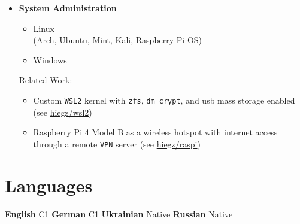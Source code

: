 \documentclass[]{article}
\begin{document}
\begin{minipage}[t]{0.49\linewidth}
    \begin{itemize}[leftmargin=0.15in, rightmargin=0.15in, label={}]
        \item {\large\bfseries System Administration}

            \begin{itemize}
                \item Linux \\ (Arch, Ubuntu, Mint, Kali, Raspberry Pi OS)
                \item Windows
            \end{itemize}
            Related Work:
            \begin{itemize}
                \item Custom \verb|WSL2| kernel with \verb|zfs|, \verb|dm_crypt|, and usb mass storage enabled
                    (see \href{https://github.com/hiegz/wsl2}{\ttfamily hiegz/wsl2})
                \item Raspberry Pi 4 Model B as a wireless hotspot with
                    internet access through a remote \verb|VPN| server
                    (see \href{https://github.com/hiegz/raspi}{\ttfamily hiegz/raspi})
            \end{itemize}
    \end{itemize}
\end{minipage}

\vspace{5pt}
\section{Languages}

\hspace{0.15in}
\textbf{English} \:  C1 \hspace{20pt} \textbf{German} \: C1 \hspace{20pt} \textbf{Ukrainian} \: Native \hspace{20pt} \textbf{Russian} \: Native
\end{document}
